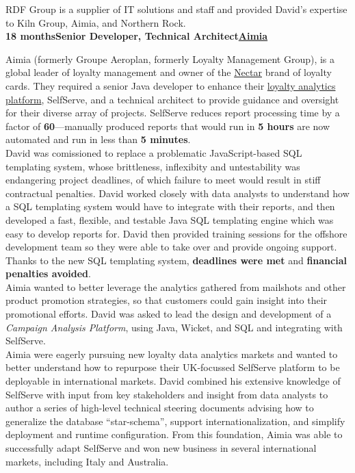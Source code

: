 \documentclass[a4paper,12pt]{article}
\newcommand{\clientwork}[3]{\textbf{#1\hfill#3\hfill#2}\nopagebreak}
\begin{document}
RDF Group is a supplier of IT solutions and staff and provided David's expertise to Kiln Group, Aimia, and Northern Rock.\\

\clientwork{18 months}{\href{http://www.aimia.com/}{Aimia}}{Senior Developer, Technical Architect}

Aimia (formerly Groupe Aeroplan, formerly Loyalty Management Group), is a global leader of loyalty management and owner of the \href{http://www.nectar.com/}{Nectar} brand of loyalty cards. They required a senior Java developer to enhance their \href{http://www.aimia.com/English/Services/Loyalty-Analytics/default.aspx}{loyalty analytics platform}, SelfServe, and a technical architect to provide guidance and oversight for their diverse array of projects. SelfServe reduces report processing time by a factor of \textbf{60}---manually produced reports that would run in \textbf{5 hours} are now automated and run in less than \textbf{5 minutes}.\\

David was comissioned to replace a problematic JavaScript-based SQL templating system, whose brittleness, inflexibity and untestability was endangering project deadlines, of which failure to meet would result in stiff contractual penalties. David worked closely with data analysts to understand how a SQL templating system would have to integrate with their reports, and then developed a fast, flexible, and testable Java SQL templating engine which was easy to develop reports for. David then provided training sessions for the offshore development team so they were able to take over and provide ongoing support. Thanks to the new SQL templating system, \textbf{deadlines were met} and \textbf{financial penalties avoided}. \\

Aimia wanted to better leverage the analytics gathered from mailshots and other product promotion strategies, so that customers could gain insight into their promotional efforts. David was asked to lead the design and development of a \emph{Campaign Analysis Platform}, using Java, Wicket, and SQL and integrating with SelfServe.\\

Aimia were eagerly pursuing new loyalty data analytics markets and wanted to better understand how to repurpose their UK-focussed SelfServe platform to be deployable in international markets. David combined his extensive knowledge of SelfServe with input from key stakeholders and insight from data analysts to author a series of high-level technical steering documents advising how to generalize the database ``star-schema'', support internationalization, and simplify deployment and runtime configuration. From this foundation, Aimia was able to successfully adapt SelfServe and won new business in several international markets, including Italy and Australia.\\
\end{document}
